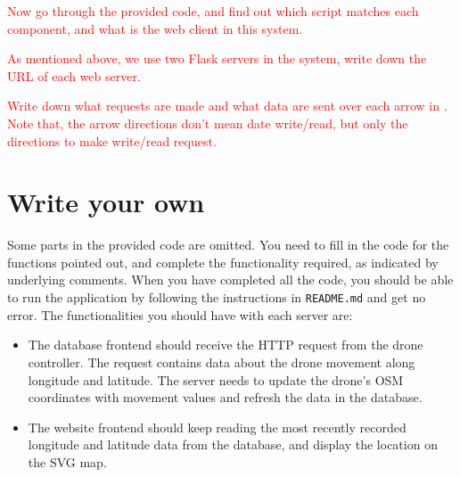 \documentclass{article}
\begin{document}
\parbox[t]{13cm}{\textcolor{red}{Now go through the provided code, and find out which script matches each component, and what is the web client in this system.}}\vspace{0.5cm}

\parbox[t]{13cm}{\textcolor{red}{As mentioned above, we use two Flask servers in the system, write down the URL of each web server.}}\vspace{0.5cm}

\parbox[t]{13cm}{\textcolor{red}{Write down what requests are made and what data are sent over each arrow in . Note that, the arrow directions don't mean date write/read, but only the directions to make write/read request.}}\vspace{0.5cm}

\section{Write your own}

Some parts in the provided code are omitted. You need to fill in the code for the functions pointed out, and complete the functionality required, as indicated by underlying comments. When you have completed all the code, you should be able to run the application by following the instructions in \verb!README.md! and get no error. The functionalities you should have with each server are:
\begin{itemize}
    \item The database frontend should receive the HTTP request from the drone controller. The request contains data about the drone movement along longitude and latitude. The server needs to update the drone's OSM coordinates with movement values and refresh the data in the database.
    \item The website frontend should keep reading the most recently recorded longitude and latitude data from the database, and display the location on the SVG map.
\end{itemize}
\end{document}
